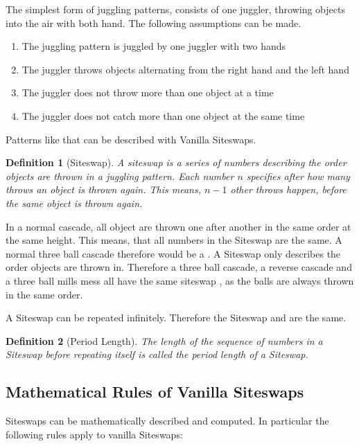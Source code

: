 \documentclass[a4paper,12pt,parskip=full]{scrreprt}
\newtheorem{definition}{Definition}
\begin{document}
	The simplest form of juggling patterns, consists of one juggler, throwing objects into the air with both hand. The following assumptions can be made.
	
	\begin{enumerate}
		\item The juggling pattern is juggled by one juggler with two hands
		\item The juggler throws objects alternating from the right hand and the left hand
		\item The juggler does not throw more than one object at a time
		\item The juggler does not catch more than one object at the same time
	\end{enumerate}

	Patterns like that can be described with Vanilla Siteswaps. 
	
	\begin{definition}[Siteswap]
		A siteswap is a series of numbers describing the order objects are thrown in a juggling pattern. Each number $n$ specifies after how many throws an object is thrown again. This means, $n-1$ other throws happen, before the same object is thrown again.
	\end{definition}

	In a normal cascade, all object are thrown one after another in the same order at the same height. This means, that all numbers in the Siteswap are the same. A normal three ball cascade therefore would be a . A Siteswap only describes the order objects are thrown in. Therefore a three ball cascade, a reverse cascade and a three ball mills mess all have the same siteswap , as the balls are always thrown in the same order.
	
	A Siteswap can be repeated infinitely. Therefore the Siteswap  and  are the same. 
	
	\begin{definition}[Period Length]
		The length of the sequence of numbers in a Siteswap before repeating itself is called the period length of a Siteswap.
	\end{definition}

	\subsection{Mathematical Rules of Vanilla Siteswaps}
	
	Siteswaps can be mathematically described and computed. In particular the following rules apply to vanilla Siteswaps:
	
\end{document}

